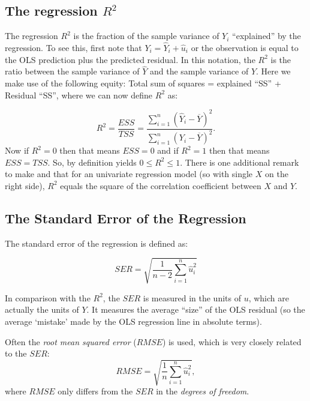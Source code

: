 \documentclass[
]{book}
\begin{document}
\hypertarget{the-regression-r2}{%
\subsection{\texorpdfstring{The regression \(R^2\)}{The regression R\^{}2}}\label{the-regression-r2}}

The regression \(R^2\) is the fraction of the sample variance of \(Y_i\) ``explained'' by the
regression. To see this, first note that \(Y_i = \hat{Y}_i + \hat{u}_i\) or the observation is equal to the OLS prediction plus the predicted residual. In this notation, the \(R^2\) is the ratio between the sample variance of \(\hat{Y}\) and the sample variance of \(Y\). Here we make use of the following equity: Total sum of squares = explained ``SS'' + Residual ``SS'', where we can now define \(R^2\) as:

\begin{equation}
R^2= \frac{ESS}{TSS} = \frac{\sum^n_{i=1}\left(\hat{Y}_i - \overline{Y}\right)^2}{\sum^n_{i=1}\left(Y_i - \overline{Y}\right)^2}.
    \label{eq:r2}
\end{equation}
Now if \(R^2 = 0\) then that means \(ESS = 0\) and if \(R^2 = 1\) then that means \(ESS = TSS\). So, by definition yields \(0 \leq R^2 \leq 1\). There is one additional remark to make and that for an univariate regression model (so with single \(X\) on the right side), \(R^2\) equals the square of the correlation coefficient between \(X\) and \(Y\).

\hypertarget{the-standard-error-of-the-regression}{%
\subsection{The Standard Error of the Regression}\label{the-standard-error-of-the-regression}}

The standard error of the regression is defined as:

\begin{equation}
SER = \sqrt{\frac{1}{n-2} \sum_{i=1}^n \hat{u}_i^2}
\label{eq:ser}
\end{equation}

In comparison with the \(R^2\), the \(SER\) is measured in the units of \(u\), which are actually the units of \(Y\). It measures the average ``size'' of the OLS residual (so the average `mistake' made by the OLS regression line in absolute terms).

Often the \emph{root mean squared error} (\(RMSE\)) is used, which is very closely related to the \(SER\):
\begin{equation}
RMSE = \sqrt{\frac{1}{n} \sum_{i=1}^n \hat{u}_i^2},
\label{eq:rmse}
\end{equation}
where \(RMSE\) only differs from the \(SER\) in the \emph{degrees of freedom}.
\end{document}
